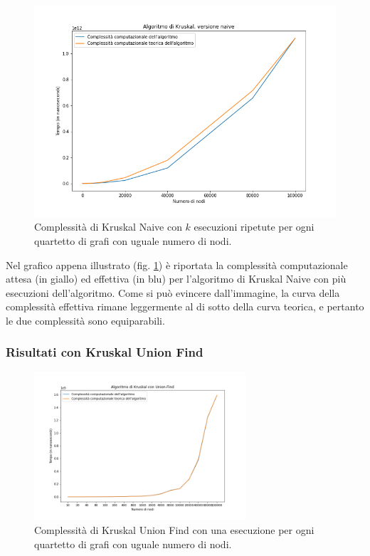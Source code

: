 \begin{figure}[H]
	\centering
	\includegraphics[width=1\textwidth]{res/images/graph-complexity/kruskal_naive.png}
    \caption{Complessità di Kruskal Naive con \(k\) esecuzioni ripetute per ogni quartetto di grafi con uguale numero di nodi.}
	\label{fig:kruskal}
\end{figure}

Nel grafico appena illustrato (fig. \ref{fig:kruskal}) è riportata la complessità computazionale attesa (in giallo) ed effettiva (in blu) per l'algoritmo di Kruskal Naive con più esecuzioni dell'algoritmo. 
Come si può evincere dall'immagine, la curva della complessità effettiva rimane leggermente al di sotto della curva teorica, e pertanto le due complessità sono equiparabili. %


\subsubsection{Risultati con Kruskal Union Find}

\begin{figure}[H]
	\centering
	\includegraphics[width=0.70\textwidth]{res/images/graph-no-rep/kruskal_uf_senza_ripetizioni.png}
    \caption{Complessità di Kruskal Union Find con una esecuzione per ogni quartetto di grafi con uguale numero di nodi.}
	\label{fig:kruskal_ufnr}
\end{figure}

